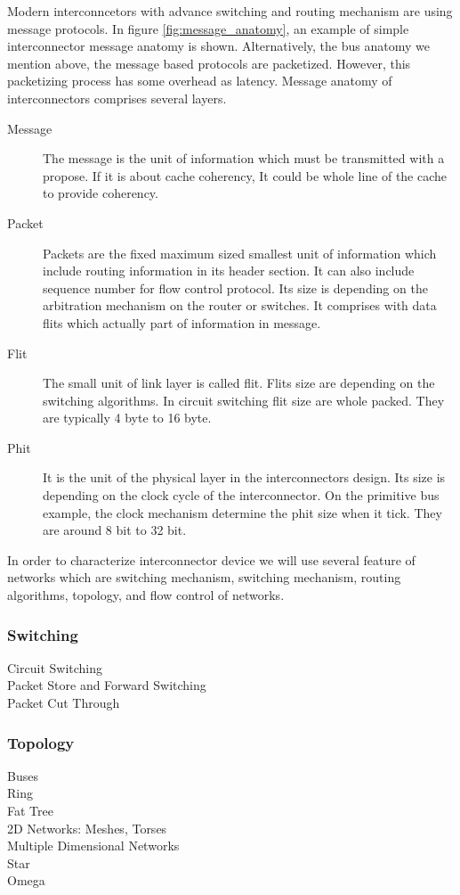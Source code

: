 Modern interconncetors with advance switching and routing mechanism are using message protocols.  In figure \ref{fig:message_anatomy}, an example of simple interconnector message anatomy is shown. Alternatively, the bus anatomy we mention above, the message based protocols are packetized. However, this packetizing process has some overhead as latency\cite{ComputerArchCoursera}. Message anatomy of interconnectors comprises several layers\cite{0122007514}.
\begin{description}
\item[Message]The message is the unit of information which must be transmitted with a propose. If it is about cache coherency, It could be whole line of the cache to provide coherency.
\item[Packet]Packets are the fixed maximum sized  smallest unit of information which include routing information in its header section. It can also include sequence number for flow control protocol. Its size is depending on the arbitration mechanism on the router or switches. It comprises with data flits which actually part of information in message.
\item[Flit]The small unit of link layer is called flit. Flits size are depending on the switching algorithms. In circuit switching flit size are whole packed. They are typically 4 byte to 16 byte.
\item[Phit]It is the unit of the physical layer in the interconnectors design. Its size is depending on the clock cycle of the interconnector. On the primitive bus example, the clock mechanism determine the phit size when it tick. They are around 8 bit to 32 bit.
\end{description}
 In order to characterize interconnector device we will use several feature of networks which are switching mechanism, switching mechanism, routing algorithms, topology, and flow control of networks.

\subsubsection{Switching}
\begin{description}
\item[Circuit Switching]
\item[Packet Store and Forward Switching]
\item[Packet Cut Through]
\end{description}
\subsubsection{Topology}
\begin{description}
\item[Buses]
\item[Ring]
\item[Fat Tree]
\item[2D Networks: Meshes, Torses]
\item[Multiple Dimensional Networks]
\item[Star]
\item[Omega]
\end{description}
